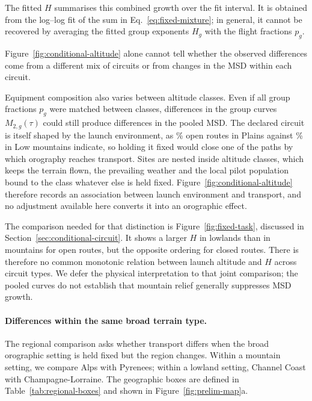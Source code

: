 The fitted $H$ summarises this combined growth over the fit interval.
It is obtained from the log--log fit of the sum in
Eq.~\eqref{eq:fixed-mixture}; in general, it cannot be recovered by averaging
the fitted group exponents $H_g$ with the flight fractions $p_g$.

Figure~\ref{fig:conditional-altitude} alone cannot tell whether the observed
differences come from a different mix of circuits or from changes in the MSD
within each circuit.

Equipment composition also varies between altitude classes. Even if all group
fractions $p_g$ were matched between classes, differences in the group curves
$M_{2,g}(\tau)$ could still produce differences in the pooled MSD.
The declared circuit is itself shaped by the launch environment, as
\ChThreeConditionalPlainsOpenPct\% open routes in Plains against
\ChThreeConditionalLowMountainsOpenPct\% in Low mountains indicate, so holding it
fixed would close one of the paths by which orography reaches transport. Sites are
nested inside altitude classes, which keeps the terrain flown, the prevailing
weather and the local pilot population bound to the class whatever else is held
fixed. Figure~\ref{fig:conditional-altitude} therefore records an association
between launch environment and transport, and no adjustment available here converts
it into an orographic effect.

The comparison needed for that distinction is Figure~\ref{fig:fixed-task},
discussed in Section~\ref{sec:conditional-circuit}. It shows a larger $H$ in
lowlands than in mountains for open routes, but the opposite ordering for
closed routes. There is therefore no common monotonic relation between launch
altitude and $H$ across circuit types. We defer the physical interpretation to
that joint comparison; the pooled curves do not establish that mountain relief
generally suppresses MSD growth.

\paragraph{Differences within the same broad terrain type.}
The regional comparison asks whether transport differs when the broad orographic
setting is held fixed but the region changes. Within a mountain setting, we
compare Alps with Pyrenees; within a lowland setting, Channel Coast with
Champagne-Lorraine. The geographic boxes are defined in
Table~\ref{tab:regional-boxes} and shown in Figure~\ref{fig:prelim-map}a.

